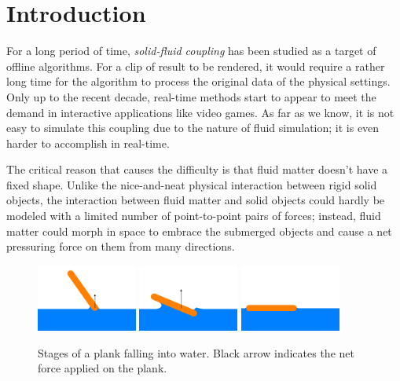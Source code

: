 \section{Introduction}

For a long period of time, \emph{solid-fluid coupling} has been studied as a target of offline algorithms.
For a clip of result to be rendered, it would require a rather long time for the algorithm to process the original data of the physical settings.
Only up to the recent decade, real-time methods start to appear to meet the demand in interactive applications like video games.
As far as we know, it is not easy to simulate this coupling due to the nature of fluid simulation;
it is even harder to accomplish in real-time.

The critical reason that causes the difficulty is that fluid matter doesn't have a fixed shape.
Unlike the nice-and-neat physical interaction between rigid solid objects, the interaction between fluid matter and solid objects could hardly be modeled with a limited number of point-to-point pairs of forces;
instead, fluid matter could morph in space to embrace the submerged objects and cause a net pressuring force on them from many directions.

\begin{figure}[h]
	\begin{center}
		\includegraphics[width=1.3in]{figures/stages-of-a-plank-falling-into-water/1.png}
		\includegraphics[width=1.3in]{figures/stages-of-a-plank-falling-into-water/2.png}
		\includegraphics[width=1.3in]{figures/stages-of-a-plank-falling-into-water/3.png}
	\end{center}
	\caption{
		Stages of a plank falling into water.
		Black arrow indicates the net force applied on the plank.
	}
	\label{stages-of-a-plank-falling-into-water}
\end{figure}

